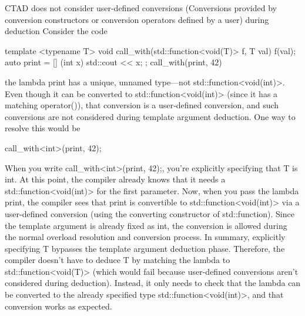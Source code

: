 \documentclass{report}
\begin{document}
\pagebreak 
{}
\bigbreak \noindent 
CTAD does not consider user-defined conversions (Conversions provided by conversion constructors or conversion operators defined by a user) during deduction
\bigbreak \noindent 
Consider the code
\bigbreak \noindent 
\begin{cppcode}
template <typename T>
void call_with(std::function<void(T)> f, T val) {
    f(val);
}
auto print = [] (int x) { std::cout << x; };
call_with(print, 42)
\end{cppcode}
\bigbreak \noindent 
the lambda print has a unique, unnamed type—not std::function<void(int)>. Even though it can be converted to std::function<void(int)> (since it has a matching operator()), that conversion is a user‐defined conversion, and such conversions are not considered during template argument deduction.
\bigbreak \noindent 
One way to resolve this would be 
\begin{cppcode}
    call_with<int>(print, 42);
\end{cppcode}
\bigbreak \noindent 
When you write call\_with<int>(print, 42);, you're explicitly specifying that T is int.
\bigbreak \noindent 
At this point, the compiler already knows that it needs a std::function<void(int)> for the first parameter. Now, when you pass the lambda print, the compiler sees that print is convertible to std::function<void(int)> via a user-defined conversion (using the converting constructor of std::function). Since the template argument is already fixed as int, the conversion is allowed during the normal overload resolution and conversion process.
\bigbreak \noindent 
In summary, explicitly specifying T bypasses the template argument deduction phase. Therefore, the compiler doesn't have to deduce T by matching the lambda to std::function<void(T)> (which would fail because user-defined conversions aren't considered during deduction). Instead, it only needs to check that the lambda can be converted to the already specified type std::function<void(int)>, and that conversion works as expected.

\bigbreak \noindent 
\end{document}
